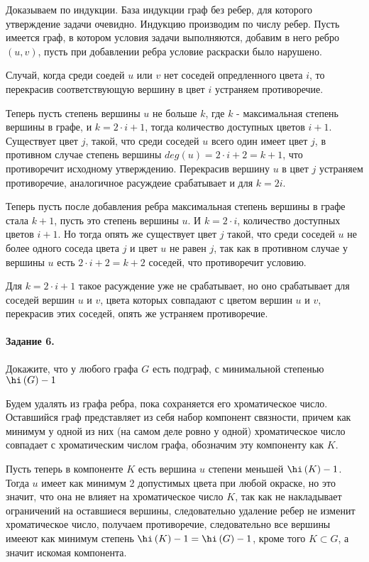 \documentclass[a4paper,12pt]{article}
\begin{document}
\begin{Solution}
Доказываем по индукции. База индукции граф без ребер, для которого утверждение задачи очевидно. Индукцию производим по числу ребер. Пусть имеется граф, в котором условия задачи выполняются, добавим в него ребро $(u,v)$, пусть при добавлении ребра условие раскраски было нарушено.

Случай, когда среди соедей $u$ или $v$ нет соседей опредленного цвета $i$, то перекрасив соответствующую вершину в цвет $i$ устраняем противоречие.

Теперь пусть степень вершины $u$ не больше $k$, где $k$ - максимальная степень вершины в графе, и $k = 2\cdot i + 1$, тогда количество доступных цветов $i + 1$. Существует цвет $j$, такой, что среди соседей $u$ всего один имеет цвет $j$, в противном случае степень вершины $deg\left(u\right) = 2\cdot i + 2 = k + 1$, что противоречит исходному утверждению. Перекрасив вершину $u$ в цвет $j$ устраняем противоречие, аналогичное расуждеие срабатывает и для $k = 2i$.

Теперь пусть после добавления ребра максимальная степень вершины в графе стала $k+1$, пусть это степень вершины $u$. И $k = 2 \cdot i$, количество доступных цветов $i + 1$. Но тогда опять же существует цвет $j$ такой, что среди соседей $u$ не более одного соседа цвета $j$ и цвет $u$ не равен $j$, так как в противном случае у вершины $u$ есть $2 \cdot i + 2 = k + 2$ соседей, что противоречит условию.

Для $k = 2\cdot i + 1$ такое расуждение уже не срабатывает, но оно срабатывает для соседей вершин $u$ и $v$, цвета которых совпадают с цветом вершин $u$ и $v$, перекрасив этих соседей, опять же устраняем противоречие.
\end{Solution}

\paragraph{Задание 6.} Докажите, что у любого графа $G$ есть подграф, с минимальной степенью $\hi \left(G\right) - 1$

\begin{Solution}
Будем удалять из графа ребра, пока сохраняется его хроматическое число. Оставшийся граф представляет из себя набор компонент связности, причем как минимум у одной из них (на самом деле ровно у одной) хроматическое число совпадает с хроматическим числом графа, обозначим эту компоненту как $K$.

Пусть теперь в компоненте $K$ есть вершина $u$ степени меньшей $\hi \left(K\right) - 1$. Тогда $u$ имеет как минимум 2 допустимых цвета при любой окраске, но это значит, что она не влияет на хроматическое число $K$, так как не накладывает ограничений на оставшиеся вершины, следовательно удаление ребер не изменит хроматическое число, получаем противоречие, следовательно все вершины имееют как минимум степень $\hi \left(K\right) - 1 = \hi \left(G\right) - 1$, кроме того $K \subset G$, а значит искомая компонента.
\end{Solution}
\end{document}
